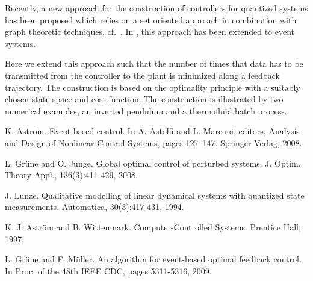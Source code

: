 Recently, a new approach for the construction of controllers for quantized systems has been proposed which relies on a set oriented approach in combination with graph theoretic techniques, cf.\ \cite{GrJu08a}.  In \cite{GrMu09a}, this approach has been extended to event systems.

Here we extend this approach such that the number of times that data has to be transmitted from the controller to the plant is minimized along a feedback trajectory.  The construction is based on the optimality principle with a suitably chosen state space and cost function.
The construction is illustrated by two numerical examples, an inverted pendulum and a thermofluid batch process.



\begin{thebibliography}{10}

{\sc K. Astr\"om}. {Event based control}. In A. Astolfi and L. Marconi, editors, Analysis and Design of   Nonlinear Control Systems, pages 127--147. Springer-Verlag, 2008..



{\sc L. Gr\"une and O. Junge}. {Global optimal control of perturbed systems}. J. Optim. Theory Appl., 136(3):411-429, 2008.



{\sc J. Lunze}. {Qualitative modelling of linear dynamical systems with quantized state measurements}. Automatica, 30(3):417-431, 1994.



{\sc K. J. Astr\"om and B. Wittenmark}. {Computer-Controlled Systems}. Prentice Hall, 1997.



{\sc L. Gr\"une and F. M\"uller}. {An algorithm for event-based optimal feedback control}. In Proc. of the 48th IEEE CDC, pages 5311-5316, 2009.

\end{thebibliography}

